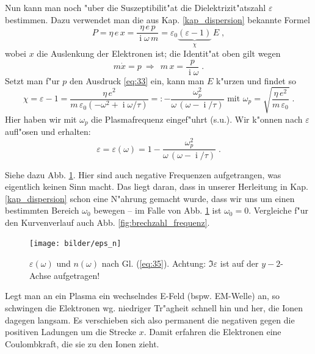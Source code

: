 \documentclass[twoside,a4paper]{book}
\newcommand{\Folgt}{\ensuremath{~ \Rightarrow ~ ~ }}
\newcommand{\I}{\ensuremath{\operatorname{i}}}
\newcommand{\abs}[0]{\bigskip \noindent}
\begin{document}
\abs
Nun kann man noch "uber die Suszeptibilit"at die
Dielektrizit"atszahl $\varepsilon$ bestimmen. Dazu verwendet man die
aus Kap. \ref{kap_dispersion} bekannte Formel
\begin{equation*}
   P = \eta \, e\, x = \frac{\eta \, e \, p}{\I \omega \, m} =
   \varepsilon_0 \underbrace{ (\varepsilon - 1) }_\chi \, E \;,
\end{equation*}
wobei $x$ die Auslenkung der Elektronen ist; die Identit"at oben gilt
wegen 
\begin{equation*}
m \dot x = p \Folgt m\, x =\frac{p}{\I \omega}    \;.
\end{equation*}
Setzt man f"ur $p$ den Ausdruck \eqref{eq:33} ein, kann man $E$
k"urzen und findet so
\begin{equation}
   \label{eq:34}
   \chi = \varepsilon - 1 
=
\frac{\eta \, e^2}{m \, \varepsilon_0 (- \omega^2 + \I \omega / \tau)}
=:
-\frac{\omega_p^2}{\omega\, (\omega - \I / \tau)} \text{ mit }
\omega_p = \sqrt{\frac{\eta \, e^2}{m\, \varepsilon_0}} \;. 
\end{equation}
Hier haben wir mit $\omega_p$ die Plasmafrequenz eingef"uhrt
(s.u.). Wir k"onnen nach $\varepsilon$ aufl"osen und erhalten:
\begin{equation}
   \label{eq:35}
\boxed{ \varepsilon = \varepsilon(\omega) = 1 - \frac{\omega_p^2}{\omega\, (\omega - \I /
    \tau)}} \;.
\end{equation}

Siehe dazu Abb. \ref{abb_eps_n}. Hier sind auch negative Frequenzen
aufgetrangen, was eigentlich keinen Sinn macht. Das liegt daran, dass
in unserer Herleitung in Kap. \ref{kap_dispersion} schon eine N"ahrung
gemacht wurde, dass wir uns um einen bestimmten Bereich $\omega_0$
bewegen -- im Falle von Abb. \ref{abb_eps_n} ist $\omega_0 =
0$. Vergleiche f"ur den Kurvenverlauf auch Abb. \ref{fig:brechzahl_frequenz}.


\begin{figure}
   \centering
   \texttt{[image: bilder/eps\_n]}
   \caption[$\varepsilon(\omega)$ und
   $n(\omega)$]{$\varepsilon(\omega)$ und $n(\omega)$ nach
     Gl. (\ref{eq:35}). Achtung: $\Im \varepsilon$ ist auf der
     $y-2$-Achse aufgetragen!}
   \label{abb_eps_n}
\end{figure}




\abs 
%
Legt man an ein Plasma ein wechselndes E-Feld (bspw. EM-Welle) an, so
schwingen die Elektronen wg. niedriger Tr"agheit schnell hin und her,
die Ionen dagegen langsam. Es verschieben sich also permanent die
negativen gegen die positiven Ladungen um die Strecke $x$. Damit
erfahren die Elektronen eine Coulombkraft, die sie zu den Ionen
zieht. 
\end{document}
